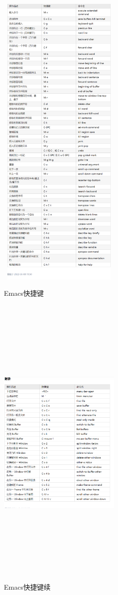 \documentclass[a4paper]{article}
\begin{document}
            \begin{figure}[H]
	\centering
	\begin{minipage}{0.49\linewidth}
		\centering
		\includegraphics[width=6cm,height=15cm]{images/Emacs快捷键.png}
		\caption{Emacs快捷键}
		\label{fig1}%
	\end{minipage}
	\begin{minipage}{0.49\linewidth}
		\centering
		\includegraphics[width=6cm,height=15cm]{images/Emacs快捷键续.png}
		\caption{Emacs快捷键续}
		\label{fig1}%
	\end{minipage}
      \end{figure}
\end{document}
